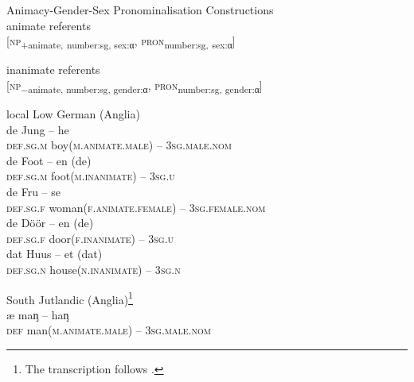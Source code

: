 \documentclass[output=paper]{langsci/langscibook}
\begin{document}
\ea
\label{ex:hoeder:12}
Animacy-Gender-Sex Pronominalisation Constructions\\

	\ea\label{ex:hoeder:12a}
	animate referents\\
       {[}\textsc{np}\textsubscript{+animate,} \textsubscript{number:sg}\textsubscript{, sex:}{\textsubscript{α}}, \textsc{pron}\textsubscript{number:sg,} {\textsubscript{sex:}\textsubscript{α}}{]}
       
	\ex\label{ex:hoeder:12b}
	inanimate referents\\
       {[}\textsc{np}\textsc{\textsubscript{$-$}}\textsubscript{animate}\textsubscript{, number:sg, gender:}\textsubscript{α}, \textsc{pron}\textsubscript{number:sg, gender:}\textsubscript{α}{]}
       
    \z
   \z
       
       
\ea\label{ex:hoeder:13}
	local Low German (Anglia)\\
	\ea\label{ex:hoeder:13a}
	\gll de Jung – he\\
     \textsc{def.sg.m} boy(\textsc{m.animate.male}) – 3\textsc{sg.male.nom}\\

	\ex\label{ex:hoeder:13b}
	\gll de Foot – en (de)\\
     \textsc{def.sg.m}{} foot(\textsc{m.inanimate}) – 3\textsc{sg.u}\\

	\ex\label{ex:hoeder:13c}
	\gll de Fru – se\\
     \textsc{def.sg.f} woman(\textsc{f.animate.female}){} – 3\textsc{sg.female.nom}\\

	\ex\label{ex:hoeder:13d}
	\gll de Döör –{} en (de)\\
     \textsc{def.sg.f}{} door(\textsc{f.inanimate}) – 3\textsc{sg.u}\\

	\ex\label{ex:hoeder:13e}
	\gll dat Huus – et (dat)\\
     \textsc{def.sg.n} house(\textsc{n.inanimate}){} – 3\textsc{sg.n}\\
\z
\z

\ea\label{ex:hoeder:14}
South Jutlandic (Anglia)\footnote{The transcription follows \citet{JulNielsen.1995}.}\\
	\ea\label{ex:hoeder:14a}	
	\gll æ maᶇ – haᶇ\\
     \textsc{def} man(\textsc{m.animate.male}){} – 3\textsc{sg.male.nom}\\
\end{document}
